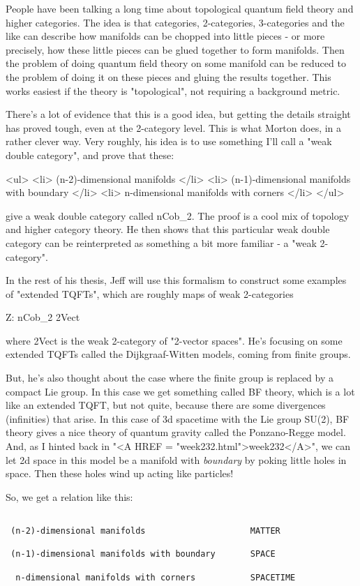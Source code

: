 People have been talking a long time about topological quantum field 
theory and higher categories.  The idea is that categories, 2-categories, 
3-categories and the like can describe how manifolds can be chopped into 
little pieces - or more precisely, how these little pieces can be glued 
together to form manifolds.  Then the problem of doing quantum field 
theory on some manifold can be reduced to the problem of doing it on 
these pieces and gluing the results together.  This works easiest if 
the theory is "topological", not requiring a background metric.

There's a lot of evidence that this is a good idea, but getting the details
straight has proved tough, even at the 2-category level.  This is what 
Morton does, in a rather clever way.  Very roughly, his idea is to use 
something I'll call a "weak double category", and prove that these:

<ul>
<li>
 (n-2)-dimensional manifolds
</li>
<li>
 (n-1)-dimensional manifolds with boundary
</li>
<li>
  n-dimensional manifolds with corners
</li>
</ul>

give a weak double category called nCob_{2}.  The proof is a
cool mix of topology and higher category theory.  He then shows that
this particular weak double category can be reinterpreted as something
a bit more familiar - a "weak 2-category".

In the rest of his thesis, Jeff will use this formalism to construct
some examples of "extended TQFTs", which are roughly maps of
weak 2-categories

Z: nCob_{2} \to  2Vect

where 2Vect is the weak 2-category of "2-vector spaces".  He's
focusing on some extended TQFTs called the Dijkgraaf-Witten models,
coming from finite groups.  

But, he's also thought about the case where the finite group is
replaced by a compact Lie group.  In this case we get something 
called BF theory, which is a lot like an extended TQFT, but not quite,
because there are some divergences (infinities) that arise. 
In this case of 3d spacetime with the Lie group SU(2), BF theory gives
a nice theory of quantum gravity called the Ponzano-Regge model.
And, as I hinted back in "<A HREF =
"week232.html">week232</A>", we can let 2d space in this model be
a manifold with \emph{boundary} by poking little holes in space.
Then these holes wind up acting like particles!

So, we get a relation like this:


\begin{verbatim}

 (n-2)-dimensional manifolds                     MATTER

 (n-1)-dimensional manifolds with boundary       SPACE

  n-dimensional manifolds with corners           SPACETIME
\end{verbatim}
    

